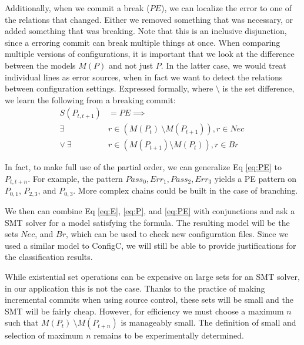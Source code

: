 Additionally, when we commit a break ($PE$), we can localize the error to one of the relations that changed.
Either we removed something that was necessary, or added something that was breaking.
Note that this is an inclusive disjunction, since a erroring commit can break multiple things at once.
When comparing multiple versions of configurations, it is important that we look at the difference between the models $M(P)$ and not just $P$.
In the latter case, we would treat individual lines as error sources, when in fact we want to detect the relations between configuration settings.
Expressed formally, where $\setminus$ is the set difference, we learn the following from a breaking commit:
\begin{align}
  S(P_{t,t+1}) &= PE \implies \nonumber \\
  \exists& r \in (M(P_{t})\ \setminus M(P_{t+1})), r \in Nec\ \nonumber \\
  \lor \ \exists& r \in (M(P_{t+1}) \setminus M(P_{t})), r \in Br \label{eq:PE}
\end{align}

In fact, to make full use of the partial order, we can generalize Eq \ref{eq:PE} to $P_{t,t+n}$.
For example, the pattern $Pass_0,Err_1,Pass_2,Err_3$ yields a PE pattern on $P_{0,1}$, $P_{2,3}$, and $P_{0,3}$. 
More complex chains could be built in the case of branching.

We then can combine Eq \ref{eq:E}, \ref{eq:P}, and \ref{eq:PE} with conjunctions and ask a SMT solver for a model satisfying the formula.
The resulting model will be the sets $Nec$, and $Br$, which can be used to check new configuration files.
Since we used a similar model to ConfigC, we will still be able to provide justifications for the classification results.

While existential set operations can be expensive on large sets for an SMT solver, in our application this is not the case.
Thanks to the practice of making incremental commits when using source control, these sets will be small and the SMT will be fairly cheap.
However, for efficiency we must choose a maximum $n$ such that $M(P_{t})\ \setminus M(P_{t+n})$ is manageably small.
The definition of small and selection of maximum $n$ remains to be experimentally determined.
